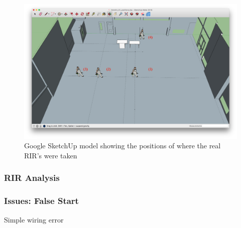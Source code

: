 \documentclass[../../main.tex]{subfiles}
\begin{document}
		\begin{figure}
			\begin{center}
				\includegraphics[scale = 0.3]{Sections/Implementation/RealRIRs/images/Real_RIRs7_edit.png} 
				\caption{Google SketchUp model showing the positions of where the real \ac{RIR}'s were taken}
				\label{rirPositions}
			\end{center}
		\end{figure}

		
		
	\subsubsection{RIR Analysis}

	\subsubsection{Issues: False Start}
		Simple wiring error
\end{document}
